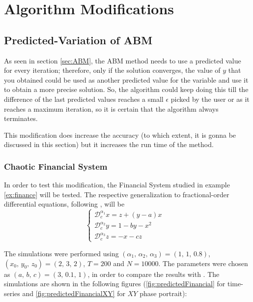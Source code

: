 \chapter{Algorithm Modifications}\label{chap:modif}
\section{Predicted-Variation of ABM} \label{sec:predABM}
As seen in section \ref{sec:ABM}, the ABM method needs to use a predicted value for every iteration; therefore, only if the solution converges, the value of $y$ that you obtained could be used as another predicted value for the variable and use it to obtain a more precise solution. So, the algorithm could keep doing this till the difference of the last predicted values reaches a small $\epsilon$ picked by the user or as it reaches a maximum iteration, so it is certain that the algorithm always terminates.

This modification does increase the accuracy (to which extent, it is gonna be discussed in this section) but it increases the run time of the method. 

\subsection{Chaotic Financial System}
In order to test this modification, the Financial System studied in example \ref{ex:finance} will be tested. The respective generalization to fractional-order differential equations, following \cite{chen2008nonlinear}, will be
\begin{equation}
    \begin{cases}
    \mathcal{D}_c^{\alpha_1} x=z+(y-a)x&\\
    \mathcal{D}_c^{\alpha_2} y=1-by-x^2&\\
    \mathcal{D}_c^{\alpha_3} z=-x-cz&
    \end{cases}
\end{equation}

The simulations were performed using $(\alpha_1,\,\alpha_2,\,\alpha_3)=(1,\,1,\, 0.8)$, $(x_0,\,y_0,\,z_0)=(2,\,3,\,2)$, $T=200$ and $N=10000$. The parameters were chosen as $(a,\,b,\,c)=(3,\,0.1,\,1)$, in order to compare the results with \cite{chen2008nonlinear}. The simulations are shown in the following figures (\ref{fig:predictedFinancial} for time-series and \ref{fig:predictedFinancialXY} for $XY$ phase portrait):

